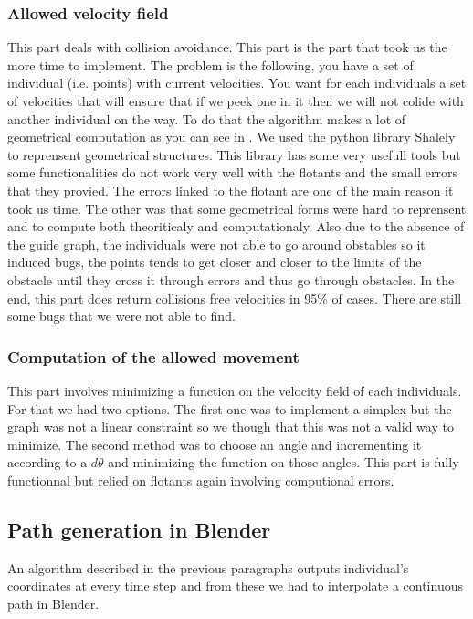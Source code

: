 \subsubsection{Allowed velocity field}

This part deals with collision avoidance. This part is the part that took us the more time to implement. The problem is the following, you have a set of individual (i.e. points) with current velocities. You want for each individuals a set of velocities that will ensure that  if we peek one in it then we will not colide with another individual on the way. To do that the algorithm makes a lot of geometrical computation as you can see in \cite{vandenBerg2011}. We used the python library Shalely to reprensent geometrical structures. This library has some very usefull tools but some functionalities do not work very well with the flotants and the small errors that they provied. The errors linked to the flotant are one of the main reason it took us time. The other was that some geometrical forms were hard to reprensent and to compute both theoriticaly and computationaly.
Also due to the absence of the guide graph, the individuals were not able to go around obstables so it induced bugs, the points tends to get closer and closer to the limits of the obstacle until they cross it through errors and thus go through obstacles.
In the end, this part does return collisions free velocities in 95\% of cases. There are still some bugs that we were not able to find.

\subsubsection{Computation of the allowed movement}

This part involves minimizing a function on the velocity field of each individuals. For that we had two options. The first one was to implement a simplex but the graph was not a linear constraint so we though that this was not a valid way to minimize. The second method was to choose an angle and incrementing it according to a $d\theta$ and minimizing the function on those angles.
This part is fully functionnal but relied on flotants again involving computional errors.

\subsection{Path generation in Blender}

An algorithm described in the previous paragraphs outputs individual's coordinates at every time step and from these we had to interpolate a continuous path in Blender. 

